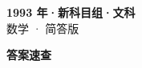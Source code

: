 \documentclass[zihao=-4, a4paper]{ctexart}
\begin{document}
\begin{center}
  {\Large\bfseries 1993 年·新科目组·文科}\\[4pt]
  {\large 数学 · 简答版}
\end{center}
\medskip
{}

\clearpage
{}
\begin{center}{\Large\bfseries 答案速查}\end{center}
\medskip

\end{document}
